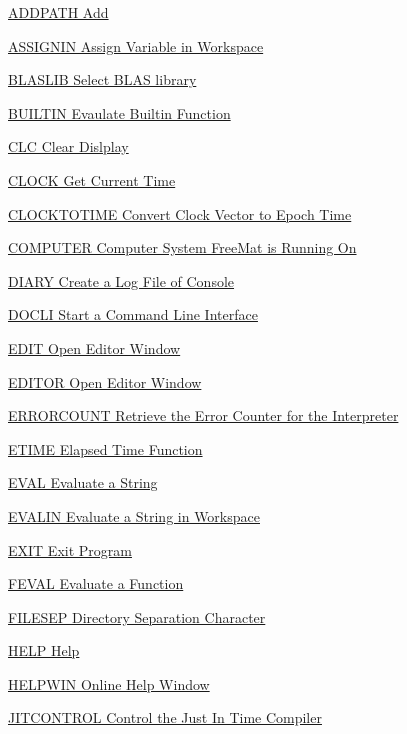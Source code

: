 
\begin{DoxyItemize}
\item \hyperlink{freemat_addpath}{A\-D\-D\-P\-A\-T\-H Add }  
\item \hyperlink{freemat_assignin}{A\-S\-S\-I\-G\-N\-I\-N Assign Variable in Workspace}  
\item \hyperlink{freemat_blaslib}{B\-L\-A\-S\-L\-I\-B Select B\-L\-A\-S library}  
\item \hyperlink{freemat_builtin}{B\-U\-I\-L\-T\-I\-N Evaulate Builtin Function}  
\item \hyperlink{freemat_clc}{C\-L\-C Clear Dislplay}  
\item \hyperlink{freemat_clock}{C\-L\-O\-C\-K Get Current Time}  
\item \hyperlink{freemat_clocktotime}{C\-L\-O\-C\-K\-T\-O\-T\-I\-M\-E Convert Clock Vector to Epoch Time}  
\item \hyperlink{freemat_computer}{C\-O\-M\-P\-U\-T\-E\-R Computer System Free\-Mat is Running On}  
\item \hyperlink{freemat_diary}{D\-I\-A\-R\-Y Create a Log File of Console}  
\item \hyperlink{freemat_docli}{D\-O\-C\-L\-I Start a Command Line Interface}  
\item \hyperlink{freemat_edit}{E\-D\-I\-T Open Editor Window}  
\item \hyperlink{freemat_editor}{E\-D\-I\-T\-O\-R Open Editor Window}  
\item \hyperlink{freemat_errorcount}{E\-R\-R\-O\-R\-C\-O\-U\-N\-T Retrieve the Error Counter for the Interpreter}  
\item \hyperlink{freemat_etime}{E\-T\-I\-M\-E Elapsed Time Function}  
\item \hyperlink{freemat_eval}{E\-V\-A\-L Evaluate a String}  
\item \hyperlink{freemat_evalin}{E\-V\-A\-L\-I\-N Evaluate a String in Workspace}  
\item \hyperlink{freemat_exit}{E\-X\-I\-T Exit Program}  
\item \hyperlink{freemat_feval}{F\-E\-V\-A\-L Evaluate a Function}  
\item \hyperlink{freemat_filesep}{F\-I\-L\-E\-S\-E\-P Directory Separation Character}  
\item \hyperlink{freemat_help}{H\-E\-L\-P Help}  
\item \hyperlink{freemat_helpwin}{H\-E\-L\-P\-W\-I\-N Online Help Window}  
\item \hyperlink{freemat_jitcontrol}{J\-I\-T\-C\-O\-N\-T\-R\-O\-L Control the Just In Time Compiler}  

\end{DoxyItemize}
